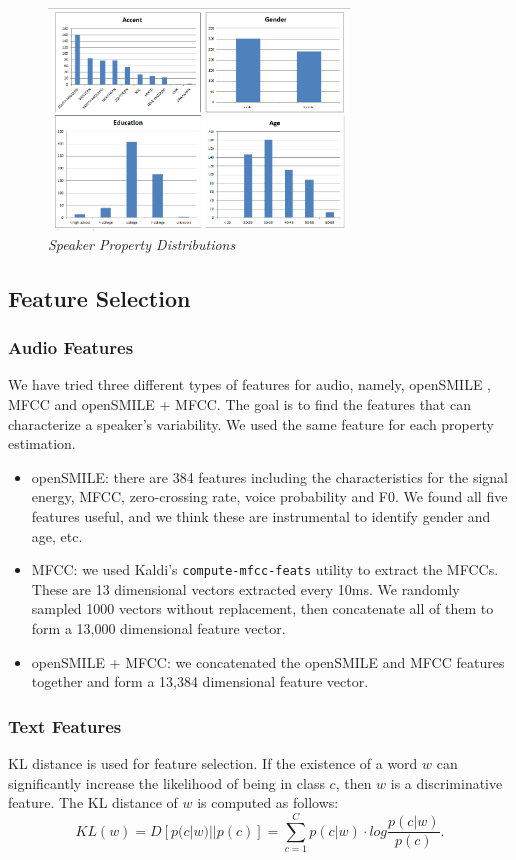 \documentclass[a4paper]{article}
\begin{document}
\begin{figure}[t]
\centerline{\includegraphics[width=80mm]{figures/priors.png}}
\caption{{\it Speaker Property Distributions}}  
\label{dists}
\end{figure}

\subsection{Feature Selection}
\subsubsection{Audio Features}
We have tried three different types of features for audio, namely, openSMILE \cite{eyben}, MFCC and openSMILE + MFCC. The goal is to find the features that can characterize a speaker's variability. We used the same feature for each property estimation.

\begin{itemize}
\item openSMILE: there are 384 features including the characteristics for the signal energy, MFCC, zero-crossing rate, voice probability and F0. We found all five features useful, and we think these are instrumental to identify gender and age, etc.

\item MFCC: we used Kaldi's \cite{povey} \texttt{compute-mfcc-feats} utility to extract the MFCCs. These are 13 dimensional vectors extracted every 10ms. We randomly sampled 1000 vectors without replacement, then concatenate all of them to form a 13,000 dimensional feature vector.

\item openSMILE + MFCC: we concatenated the openSMILE and MFCC features together and form a 13,384 dimensional feature vector.
\end{itemize}

\subsubsection{Text Features}
KL distance is used for feature selection. If the existence of a word $w$ can significantly increase the likelihood of being in class $c$, then $w$ is a discriminative feature. The KL distance of $w$ is computed as follows:
\begin{equation}
  KL(w) = D[p(c|w)||p(c)] = \sum_{c=1}^{C}p(c|w)\cdot log\frac{p(c|w)}{p(c)}.
\label{kl}
\end{equation}
\end{document}
